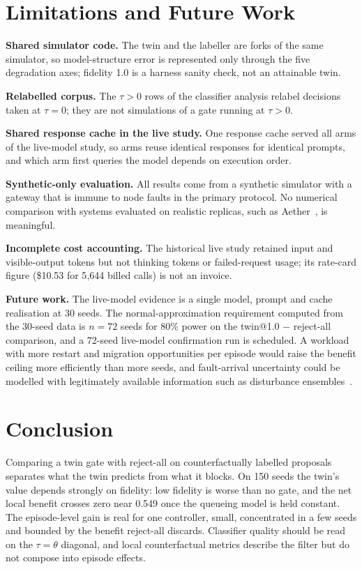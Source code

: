 \documentclass[conference]{IEEEtran}
\begin{document}
\section{Limitations and Future Work}
\label{sec:limits}

\textbf{Shared simulator code.} The twin and the labeller are forks of the same simulator, so model-structure error is represented only through the five degradation axes; fidelity 1.0 is a harness sanity check, not an attainable twin.

\textbf{Relabelled corpus.} The $\tau>0$ rows of the classifier analysis relabel decisions taken at $\tau=0$; they are not simulations of a gate running at $\tau>0$.

\textbf{Shared response cache in the live study.} One response cache served all arms of the live-model study, so arms reuse identical responses for identical prompts, and which arm first queries the model depends on execution order.

\textbf{Synthetic-only evaluation.} All results come from a synthetic simulator with a gateway that is immune to node faults in the primary protocol. No numerical comparison with systems evaluated on realistic replicas, such as Aether~\cite{aether}, is meaningful.

\textbf{Incomplete cost accounting.} The historical live study retained input and visible-output tokens but not thinking tokens or failed-request usage; its rate-card figure (\$10.53 for 5{,}644 billed calls) is not an invoice.

\textbf{Future work.} The live-model evidence is a single model, prompt and cache realisation at 30 seeds. The normal-approximation requirement computed from the 30-seed data is $n=72$ seeds for 80\% power on the twin@1.0 $-$ reject-all comparison, and a 72-seed live-model confirmation run is scheduled. A workload with more restart and migration opportunities per episode would raise the benefit ceiling more efficiently than more seeds, and fault-arrival uncertainty could be modelled with legitimately available information such as disturbance ensembles~\cite{ddsafety,pomdpsurvey}.

\section{Conclusion}
Comparing a twin gate with reject-all on counterfactually labelled proposals separates what the twin predicts from what it blocks. On 150 seeds the twin's value depends strongly on fidelity: low fidelity is worse than no gate, and the net local benefit crosses zero near 0.549 once the queueing model is held constant. The episode-level gain is real for one controller, small, concentrated in a few seeds and bounded by the benefit reject-all discards. Classifier quality should be read on the $\tau=\theta$ diagonal, and local counterfactual metrics describe the filter but do not compose into episode effects.
\end{document}
